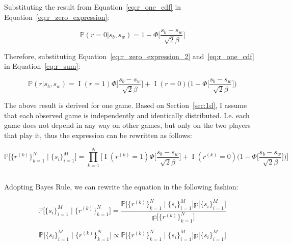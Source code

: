 \documentclass[a4paper,11pt]{article}
\theoremstyle{mytheor}
\begin{document}
Substituting the result from Equation~\ref{eq:r_one_cdf} in Equation~\ref{eq:r_zero_expression}:

\begin{equation}
    \label{eq:r_zero_expression_2}
    \mathbb{P}(r=0|s_b,s_w) = 1 - \Phi\Big[ \frac{s_b-s_w}{\sqrt{2}\beta} \Big]
\end{equation}

Therefore, substituting Equation~\ref{eq:r_zero_expression_2} and~\ref{eq:r_one_cdf} in Equation~\ref{eq:r_sum}:

\begin{equation}
    \label{eq:r_sum_2}
    \mathbb{P}(r|s_b,s_w) = \mathop{I}(r=1)\Phi\Big[ \frac{s_b-s_w}{\sqrt{2}\beta} \Big] + \mathop{I}(r=0)\Big( 1-\Phi\Big[ \frac{s_b-s_w}{\sqrt{2}\beta} \Big] \Big)
\end{equation}

The above result is derived for one game. Based on Section~\ref{sec:1d}, I assume that each observed game is independently and identically distributed. I.e. each game does not depend in any way on other games, but only on the two players that play it, thus the expression can be rewritten as follows:

\begin{equation}
    \label{eq:r_iid}
    \mathbb{P} \Big[ \{r^{(k)}\}_{k=1}^{N}  \mid \{s_i\}_{i=1}^{M} \Big] = \prod_{k=1}^{N}\Big[
    \mathop{I}(r^{(k)}=1)\Phi\Big[ \frac{s_b-s_w}{\sqrt{2}\beta} \Big] + 
    \mathop{I}(r^{(k)}=0)\Big( 1-\Phi\Big[ \frac{s_b-s_w}{\sqrt{2}\beta} \Big] \Big)
    \Big]
\end{equation}

\subsection{}

Adopting Bayes Rule, we can rewrite the equation in the following fashion:

\begin{equation}
    \label{eq:2_f_bayes}
    \mathbb{P} \Big[ \{s_i\}_{i=1}^{M} \mid \{r^{(k)}\}_{k=1}^{N} \Big] = 
    \frac{\mathbb{P} \Big[ \{r^{(k)}\}_{k=1}^{N}  \mid \{s_i\}_{i=1}^{M} \Big]\mathbb{p} \Big[ \{s_i\}_{i=1}^{M} \Big]}
    {\mathbb{p} \Big[ \{r^{(k)}\}_{k=1}^{N} \Big]}
\end{equation}

\begin{equation}
    \label{eq:2_f_bayes_2}
    \mathbb{P} \Big[ \{s_i\}_{i=1}^{M} \mid \{r^{(k)}\}_{k=1}^{N} \Big] \propto \mathbb{P} \Big[ \{r^{(k)}\}_{k=1}^{N}  \mid \{s_i\}_{i=1}^{M} \Big]\mathbb{p} \Big[ \{s_i\}_{i=1}^{M} \Big]
\end{equation}
\end{document}
